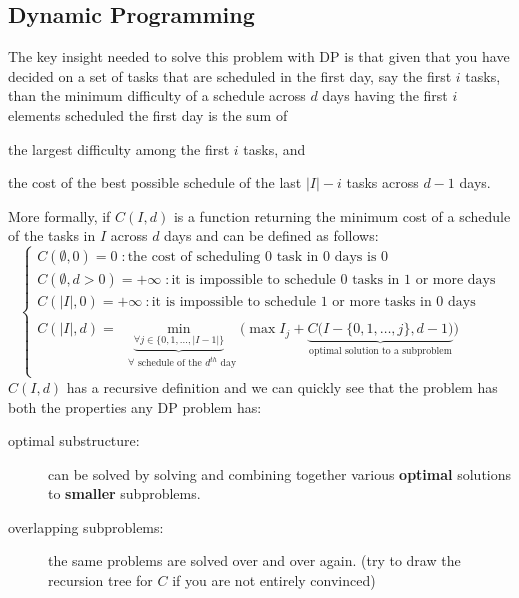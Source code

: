 \subsection{Dynamic Programming}
The key insight needed to solve this problem with DP is that given that you have decided on a set of tasks
that are scheduled in the first day, say the first $i$ tasks, than the minimum difficulty of a
schedule across $d$ days having the first $i$ elements scheduled the first day is the sum of 
\begin{enumerate*}
    \item  the largest difficulty  among the first $i$ tasks, and
    \item  the cost of the best possible schedule of the last $|I|- i$ tasks across $d-1$ days.
\end{enumerate*}
 More formally, if $C(I,d)$ is a function returning the minimum cost of a schedule of the tasks in
$I$ across $d$ days and can be defined as follows:
\begin{equation}
    \begin{cases}
        C(\emptyset, 0) = 0 \; :  \text{the cost of scheduling $0$ task in $0$ days is $0$}\\
        C(\emptyset, d > 0) = +\infty \; : \text{it is impossible to schedule $0$ tasks in $1$ or more days}\\
        C(|I|, 0) = +\infty \: :\text{it is impossible to schedule $1$ or more tasks  in $0$ days}\\\\
        C(|I|, d) = \underbrace{\min_{\forall j \in \{0,1,\ldots,|I-1|\}}}_{\text{ $\forall$ schedule of the $d^{th}$ day}} \Bigg( \max I_j + \underbrace{C\Big(I - \{0,1,\ldots,j\}, d-1\Big)}_{\text{optimal solution to a subproblem}}\Bigg)\\
     \end{cases}
    \label{eq:min_difficulty_job_scheduler:dpformula}
\end{equation}
$C(I,d)$ has a recursive definition and we can quickly see that the problem has both the properties
any DP problem has:
\begin{description}
    \item[optimal substructure:] can be solved by solving and combining together various
    \textbf{optimal} solutions to \textbf{smaller} subproblems.
    \item[overlapping subproblems:] the same problems are solved over and over again. (try to draw
    the recursion tree for $C$ if you are not entirely convinced)
\end{description}

